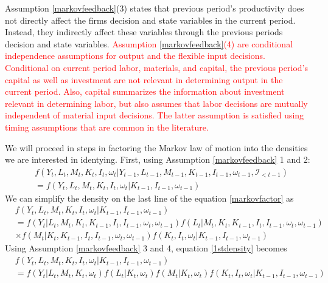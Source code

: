 \documentclass{article}
\begin{document}
Assumption \eqref{markovfeedback}(3) states that previous period's productivity does not directly affect the firms decision and state variables in the current period. Instead, they indirectly affect these variables through the previous periods decision and state variables. \textcolor{red}{Assumption \eqref{markovfeedback}(4) are conditional independence assumptions for output and the flexible input decisions. Conditional on current period labor, materials, and capital, the previous period's capital as well as investment are not relevant in determining output in the current period. Also, capital summarizes the information about investment relevant in determining labor, but also assumes that labor decisions are mutually independent of material input decisions. The latter assumption is satisfied using timing assumptions that are common in the literature.}

We will proceed in steps in factoring the Markov law of motion into the densities we are interested in identying. First, using Assumption \eqref{markovfeedback} 1 and 2:
\begin{equation} \label{markovfactor}
    \begin{split}
        &f(Y_{t}, L_{t}, M_{t}, K_{t}, I_{t}, \omega_{t}|Y_{t-1}, L_{t-1}, M_{t-1}, K_{t-1}, I_{t-1}, \omega_{t-1}, \mathcal{I}_{<t-1})\\
        &=f(Y_{t}, L_{t}, M_{t}, K_{t}, I_{t}, \omega_{t}|K_{t-1}, I_{t-1}, \omega_{t-1})
    \end{split}
\end{equation} 
We can simplify the density on the last line of the equation \eqref{markovfactor} as
\begin{equation} \label{1stdensity}
\begin{split}
&f(Y_{t}, L_{t}, M_{t}, K_{t}, I_{t}, \omega_{t}|K_{t-1}, I_{t-1}, \omega_{t-1})\\
&=f(Y_{t}|L_{t}, M_{t}, K_{t}, K_{t-1}, I_{t}, I_{t-1}, \omega_{t}, \omega_{t-1})f(L_{t}|M_{t}, K_{t}, K_{t-1}, I_{t}, I_{t-1}, \omega_{t}, \omega_{t-1})\\
&\times f(M_{t}|K_{t}, K_{t-1}, I_{t}, I_{t-1}, \omega_{t}, \omega_{t-1})f(K_{t}, I_{t}, \omega_{t}|K_{t-1}, I_{t-1}, \omega_{t-1})
\end{split}
\end{equation}
Using Assumption \eqref{markovfeedback} 3 and 4, equation \eqref{1stdensity} becomes
\begin{equation} \label{2nddensity}
    \begin{split}
        &f(Y_{t}, L_{t}, M_{t}, K_{t}, I_{t}, \omega_{t}|K_{t-1}, I_{t-1}, \omega_{t-1})\\
        &=f(Y_{t}|L_{t}, M_{t}, K_{t}, \omega_{t})f(L_{t}|K_{t}, \omega_{t})f(M_{t}|K_{t}, \omega_{t})f(K_{t}, I_{t}, \omega_{t}|K_{t-1}, I_{t-1}, \omega_{t-1})
    \end{split}
\end{equation} 
\end{document}
